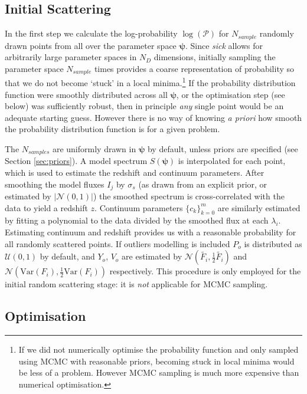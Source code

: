 \documentclass{aastex}
\newcommand{\sick}{\textit{sick}}
\begin{document}
\subsection{Initial Scattering}

In the first step we calculate the log-probability $\log{(\mathcal{P})}$ for $N_{sample}$ randomly drawn points from all over the parameter space $\bm{\psi}$. Since \sick{} allows for arbitrarily large parameter spaces in $N_{D}$ dimensions, initially sampling the parameter space $N_{sample}$ times provides a coarse representation of probability so that we do not become `stuck' in a local minima.\footnote{If we did not numerically optimise the probability function and only sampled using MCMC with reasonable priors, becoming stuck in local minima would be less of a problem. However MCMC sampling is much more expensive than numerical optimisation.} If the probability distribution function were smoothly distributed across all $\bm{\psi}$, or the optimisation step (see below) was sufficiently robust, then in principle \textit{any} single point would be an adequate starting guess. However there is no way of knowing \textit{a priori} how smooth the probability distribution function is for a given problem. 

The $N_{samples}$ are uniformly drawn in $\bm{\psi}$ by default, unless priors are specified (see Section \ref{sec:priors}). A model spectrum $S(\bm{\psi})$ is interpolated for each point, which is used to estimate the redshift and continuum parameters. After smoothing the model fluxes $I_j$ by $\sigma_s$ (as drawn from an explicit prior, or estimated by $\left|\mathcal{N}\left(0, 1\right)\right|$) the smoothed spectrum is cross-correlated with the data to yield a redshift $z$. Continuum parameters $\{c_k\}_{k=0}^{m}$ are similarly estimated by fitting a polynomial to the data divided by the smoothed flux at each $\lambda_i$. Estimating continuum and redshift provides us with a reasonable probability for all randomly scattered points. If outliers modelling is included $P_o$ is distributed as $\mathcal{U}\left(0, 1\right)$ by default, and $Y_o$, $V_o$ are estimated by $\mathcal{N}\left(\widetilde{F_i}, \frac{1}{2}\widetilde{F_i}\right)$ and $\mathcal{N}\left(\mbox{Var}\left(F_i\right),\frac{1}{2}\mbox{Var}\left(F_i\right)\right)$ respectively. This procedure is only employed for the initial random scattering stage: it is \textit{not} applicable for MCMC sampling. 


\subsection{Optimisation}
\label{sec:optimise}
\end{document}
